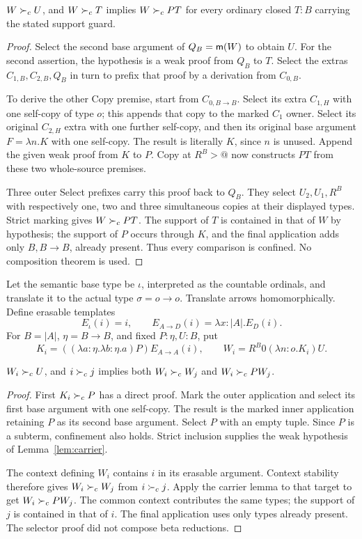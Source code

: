\begin{lemma}\label{lem:carrier}
$W\succ_c U$, and $W\succ_c T$ implies $W\succ_c PT$ for every ordinary
closed $T:B$ carrying the stated support guard.
\end{lemma}
\begin{proof}
Select the second base argument of $Q_B=\mathsf m(W)$ to obtain $U$.
For the second assertion, the hypothesis is a weak proof from $Q_B$
to $T$. Select the extras $C_{1,B},C_{2,B},Q_B$ in turn to prefix
that proof by a derivation from $C_{0,B}$.

To derive the other Copy premise, start from $C_{0,B\to B}$.
Select its extra $C_{1,H}$ with one self-copy of type $o$; this
appends that copy to the marked $C_1$ owner. Select its original
$C_{2,H}$ extra with one further self-copy, and then its original
base argument $F=\lambda n.K$ with one self-copy. The result is
literally $K$, since $n$ is unused. Append the given weak proof
from $K$ to $P$. Copy at $R^B>@$ now constructs $PT$ from these
two whole-source premises.

Three outer Select prefixes carry this proof back to $Q_B$.
They select $U_2,U_1,R^B$ with respectively one, two and three
simultaneous copies at their displayed types. Strict marking gives
$W\succ_c PT$. The support of $T$ is contained in that of $W$ by
hypothesis; the support of $P$ occurs through $K$, and the final
application adds only $B,B\to B$, already present. Thus every
comparison is confined. No composition theorem is used.
\end{proof}

Let the semantic base type be $\iota$, interpreted as the countable
ordinals, and translate it to the actual type $\sigma=o\to o$.
Translate arrows homomorphically. Define erasable templates
\[
 E_\iota(i)=i,\qquad E_{A\to D}(i)=\lambda x:|A|.E_D(i).
\]
For $B=|A|$, $\eta=B\to B$, and fixed $P:\eta,U:B$, put
\[
 K_i=((\lambda a:\eta.\lambda b:\eta.a)P)E_{A\to A}(i),
 \qquad
 W_i=R^B0(\lambda n:o.K_i)U.
\]

\begin{lemma}\label{lem:indexed-carrier}
$W_i\succ_c U$, and $i\succ_c j$ implies both
$W_i\succ_c W_j$ and $W_i\succ_c PW_j$.
\end{lemma}
\begin{proof}
First $K_i\succ_c P$ has a direct proof. Mark the outer application and
select its first base argument with one self-copy. The result is the
marked inner application retaining $P$ as its second base argument.
Select $P$ with an empty tuple. Since $P$ is a subterm, confinement
also holds. Strict inclusion supplies the weak hypothesis of
Lemma~\ref{lem:carrier}.

The context defining $W_i$ contains $i$ in its erasable argument.
Context stability therefore gives $W_i\succ_c W_j$ from $i\succ_c j$.
Apply the carrier lemma to that target to get $W_i\succ_c PW_j$.
The common context contributes the same types; the support of $j$
is contained in that of $i$. The final application uses only types
already present. The selector proof did not compose beta reductions.
\end{proof}


